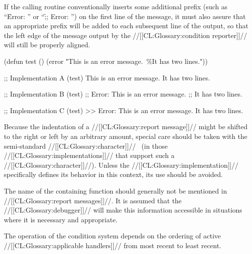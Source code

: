 If the calling routine conventionally inserts some additional prefix
(such as ``\f{Error: }'' or ``\f{;; Error: }'') on the first line of
the message, it must also assure that an appropriate prefix will be
added to each subsequent line of the output, so that the left edge of
the message output by the //[[CL:Glossary:condition reporter]]// will still be properly
aligned.

\code
 (defun test ()
   (error "This is an error message.~\%It has two lines."))

 ;; Implementation A
 (test)
 This is an error message.
 It has two lines.

 ;; Implementation B
 (test)
 ;; Error: This is an error message.
 ;;        It has two lines.

 ;; Implementation C
 (test)
 >> Error: This is an error message. 
           It has two lines.
\endcode

\endsubsubsubsection%


Because the indentation of a //[[CL:Glossary:report message]]// might be shifted to the right or
left by an arbitrary amount, special care should be taken with the
semi-standard //[[CL:Glossary:character]]// \TabChar\ 
(in those //[[CL:Glossary:implementations]]// that support such a //[[CL:Glossary:character]]//).  
Unless the //[[CL:Glossary:implementation]]// specifically defines its behavior 
in this context, its use should be avoided.

\endsubsubsubsection%


The name of the containing function should generally not be mentioned in
//[[CL:Glossary:report messages]]//.  It is assumed that the //[[CL:Glossary:debugger]]// will make this
information accessible in situations where it is necessary and appropriate.

\endsubsubsubsection%

\endsubsubsection%

\endsubsection%
\goodbreak
{}
 
The operation of the condition system depends on the ordering of
active //[[CL:Glossary:applicable handlers]]// from most recent to least recent.

